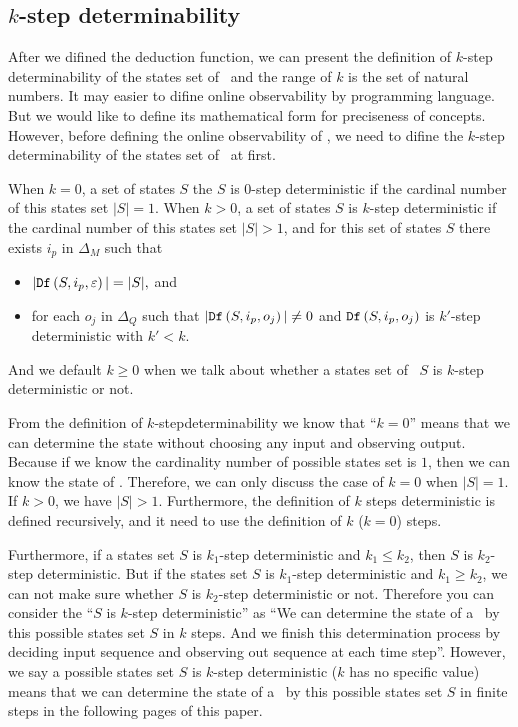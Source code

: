 \subsection{$k$-step determinability}
After we difined the deduction function, we can present the definition of $k$-step determinability of the states set of \BCNs\ and the range of $k$ is the set of natural numbers. It may easier to difine online observability by programming language. But we would like to define its mathematical form for preciseness of concepts. However, before defining the online observability of \BCNs, we need to difine the $k$-step determinability of the states set of \BCNs\ at first.
\begin{definition} 
When $k=0$, a set of states $S$ the $S$ is $0$-step deterministic if the cardinal number of this states set $|S|=1$. When $k>0$, a set of states $S$ is $k$-step deterministic
 if the cardinal number of this states set $|S|>1$, and for this set of states $S$ there exists $i_p$ in $\Delta_M$ such that
 \begin{itemize}
 \item  $|{\tt Df}\left(S,i_p,\varepsilon\right)|=|S|, $ and 
 \item  for each $o_j$ in $\Delta_Q$ such that $|{\tt Df}\left(S,i_p,o_j\right)|\neq 0$ and ${\tt Df}\left(S,i_p,o_j\right)$ is $k'$-step deterministic with  ${k'}<k$.
 \end{itemize}
 And we default $k\ge0$ when we talk about whether a states set of \BCNs\ $S$ is $k$-step deterministic or not.
\end{definition}

From the definition of {\em$k$}-stepdeterminability we know that ``$k=0$'' means that we can determine the state without choosing any input and observing output. Because if we know the cardinality number of possible states set is $1$, then we can know the state of \BCNs. Therefore, we can only discuss the case of $k=0$ when $|S|=1$. If $k>0$, we have $|S|>1$. Furthermore, the definition of $k$ steps deterministic is defined recursively, and it need to use the definition of $k$ ($k=0$) steps. 

Furthermore, if a states set $S$ is $k_1$-step deterministic and $k_1\leq k_2$, then $S$ is $k_2$-step deterministic. But if the states set $S$ is $k_1$-step deterministic and $k_1\geq k_2$, we can not make sure whether $S$ is $k_2$-step deterministic or not. Therefore you can consider the ``$S$ is $k$-step deterministic'' as ``We can determine the state of a \BCN\ by this possible states set $S$ in $k$ steps. And we finish this determination process by deciding input sequence and observing out sequence at each time step''. However, we say a possible states set $S$ is $k$-step deterministic ($k$ has no specific value) means that we can determine the state of a \BCN\ by this possible states set $S$ in finite steps in the following pages of this paper.
